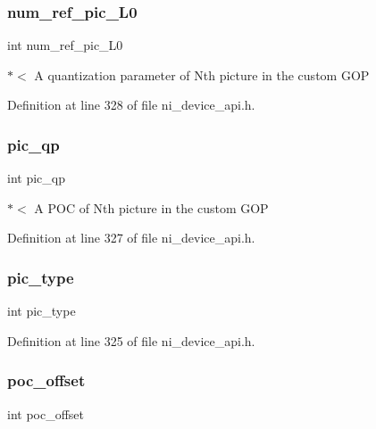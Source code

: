 \subsubsection{\texorpdfstring{num\_ref\_pic\_L0}{num\_ref\_pic\_L0}}
{\footnotesize\ttfamily int num\+\_\+ref\+\_\+pic\+\_\+\+L0}

$\ast$$<$ A quantization parameter of Nth picture in the custom G\+OP 

Definition at line 328 of file ni\+\_\+device\+\_\+api.\+h.

\mbox{\label{struct__ni__gop__params_a6e2a5882f0b5e624921d041f5e2822cb}} 
\subsubsection{\texorpdfstring{pic\_qp}{pic\_qp}}
{\footnotesize\ttfamily int pic\+\_\+qp}

$\ast$$<$ A P\+OC of Nth picture in the custom G\+OP 

Definition at line 327 of file ni\+\_\+device\+\_\+api.\+h.

\mbox{\label{struct__ni__gop__params_adda1e53e75bb6a22b7b63a8972f3403a}} 
\subsubsection{\texorpdfstring{pic\_type}{pic\_type}}
{\footnotesize\ttfamily int pic\+\_\+type}



Definition at line 325 of file ni\+\_\+device\+\_\+api.\+h.

\mbox{\label{struct__ni__gop__params_a78bb26bb9ca9c0b36f464ccecd5a2082}} 
\subsubsection{\texorpdfstring{poc\_offset}{poc\_offset}}
{\footnotesize\ttfamily int poc\+\_\+offset}

